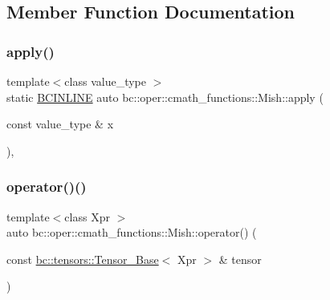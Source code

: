 \subsection{Member Function Documentation}
\mbox{\label{structbc_1_1oper_1_1cmath__functions_1_1Mish_a19910b3ca202773e3fe06814ac2f9871}} 
\subsubsection{\texorpdfstring{apply()}{apply()}}
{\footnotesize\ttfamily template$<$class value\+\_\+type $>$ \\
static \hyperlink{common_8h_a6699e8b0449da5c0fafb878e59c1d4b1}{B\+C\+I\+N\+L\+I\+NE} auto bc\+::oper\+::cmath\+\_\+functions\+::\+Mish\+::apply (\begin{DoxyParamCaption}\item[{const value\+\_\+type \&}]{x }\end{DoxyParamCaption})\hspace{0.3cm}{\ttfamily [inline]}, {\ttfamily [static]}}

\mbox{\label{structbc_1_1oper_1_1cmath__functions_1_1Mish_a49f22b21cc155c2031eba78fd7908605}} 
\subsubsection{\texorpdfstring{operator()()}{operator()()}\hspace{0.1cm}{\footnotesize\ttfamily [1/3]}}
{\footnotesize\ttfamily template$<$class Xpr $>$ \\
auto bc\+::oper\+::cmath\+\_\+functions\+::\+Mish\+::operator() (\begin{DoxyParamCaption}\item[{const \hyperlink{classbc_1_1tensors_1_1Tensor__Base}{bc\+::tensors\+::\+Tensor\+\_\+\+Base}$<$ Xpr $>$ \&}]{tensor }\end{DoxyParamCaption})\hspace{0.3cm}{\ttfamily [inline]}}

